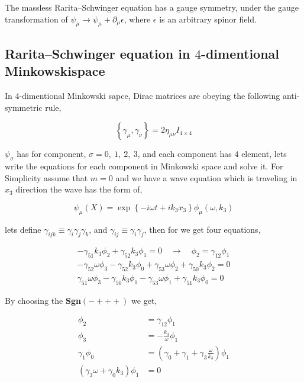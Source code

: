 The massless Rarita–Schwinger equation has a gauge symmetry, under the gauge transformation of $\psi_{\mu} \rightarrow \psi_{\mu} + \partial_{\mu} \epsilon$, where $\mathcal{\epsilon}$ is an arbitrary spinor field.\\


\subsection{Rarita–Schwinger equation in $4$-dimentional Minkowskispace}

In $4$-dimentional Minkowski sapce, Dirac matrices are obeying the following anti-symmetric rule,

\begin{equation}
   \left\{\gamma_{\mu},\gamma_{\nu}\right\} = 2\eta_{\mu\nu} I_{4\times 4}
\end{equation}

$\psi_{\sigma}$ has for component, $\sigma = 0,~1,~2,~3$, and each component has $4$ element, lets write the equations for each component in Minkowski space and solve it. For Simplicity assume that $m=0$ and we have a wave equation which is traveling in $x_3$ direction the wave has the form of,

\begin{equation}
   \psi_{\mu}(X) = \exp\left\{-i\omega t+ik_3x_3 \right\} \phi_{\mu}(\omega,k_3)
\end{equation}

lets define $\gamma_{ijk}\equiv\gamma_{i}\gamma_{j}\gamma_{k}$, and $\gamma_{ij} \equiv \gamma_{i}\gamma_{j}$, then for we get four equations,

\begin{align}
   -\gamma_{51}k_3\phi_{2} + \gamma_{52}k_3\phi_{1} =0 \quad \rightarrow \quad \phi_{2} = \gamma_{12}\phi_{1}\nonumber\\
   -\gamma_{52}\omega\phi_{3} - \gamma_{52}k_3\phi_{0} + \gamma_{53}\omega\phi_{2} + \gamma_{50}k_3\phi_{2} =0 \nonumber\\
   \gamma_{51}\omega\phi_{3} - \gamma_{50}k_3\phi_{1} - \gamma_{53}\omega\phi_{1} + \gamma_{51}k_3\phi_{0} =0 
\end{align}

By choosing the \textbf{Sgn}$(-+++)$  we get,

\begin{align}
   \phi_{2} &= \gamma_{12}\phi_{1} \nonumber\\
   \phi_{3} &= -\frac{k_3}{\omega}\phi_{1} \nonumber\\
   \gamma_{1}\phi_{0} &= (\gamma_{0} + \gamma_{1} + \gamma_{3}\frac{\omega}{k_3})\phi_{1} \nonumber\\
   (\gamma_{3}\omega + \gamma_{0}k_3)\phi_{1} &= 0
\end{align}

